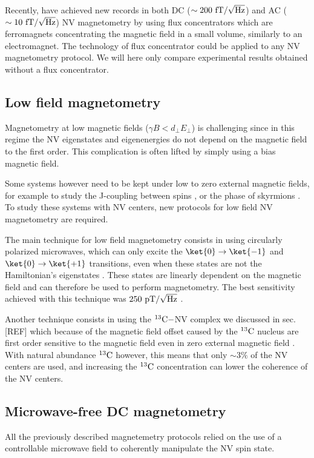 \documentclass[a4paper,11pt]{report}
\begin{document}
Recently, \citep{xie2021hybrid} have achieved new records in both DC ($\sim 200\ \rm fT/\sqrt{\rm Hz}$) and AC ($\sim 10\ \rm fT/\sqrt{\rm Hz}$) NV magnetometry by using flux concentrators which are ferromagnets concentrating the magnetic field in a small volume, similarly to an electromagnet. The technology of flux concentrator could be applied to any NV magnetometry protocol. We will here only compare experimental results obtained without a flux concentrator.

\subsection{Low field magnetometry}
Magnetometry at low magnetic fields ($\gamma B < d_\perp E_\perp$) is challenging since in this regime the NV eigenstates and eigenenergies do not depend on the magnetic field to the first order. This complication is often lifted  by simply using a bias magnetic field.

Some systems however need to be kept under low to zero external magnetic fields, for example to study the J-coupling between spins \citep{sutter2012computational}, or the phase of skyrmions \citep{zazvorka2020skyrmion}. To study these systems with NV centers, new protocols for low field NV magnetometry are required.

The main technique for low field magnetometry consists in using circularly polarized microwaves, which can only excite the $\ket{0} \to \ket{-1}$ and $\ket{0} \to \ket{+1}$ transitions, even when these states are not the Hamiltonian's eigenstates \citep{mrozek2015circularly, zheng2019zero, lenz2021magnetic, vetter2022zero}. These states are linearly dependent on the magnetic field and can therefore be used to perform magnetometry. The best sensitivity achieved with this technique was $250\ \rm pT/\sqrt{\rm Hz}$ \citep{zheng2019zero}.

Another technique consists in using the $^{13}\rm{C}-$NV complex we discussed in sec. [REF] which because of the magnetic field offset caused by the $^{13}\rm{C}$ nucleus are first order sensitive to the magnetic field even in zero external magnetic field \citep{wang2022zero}. With natural abundance $^{13}\rm{C}$ however, this means that only $\sim 3\%$ of the NV centers are used, and increasing the $^{13}\rm{C}$ concentration can lower the coherence of the NV centers. 

\subsection{Microwave-free DC magnetometry}
All the previously described magnetemetry protocols relied on the use of a controllable microwave field to coherently manipulate the NV spin state.
\end{document}

